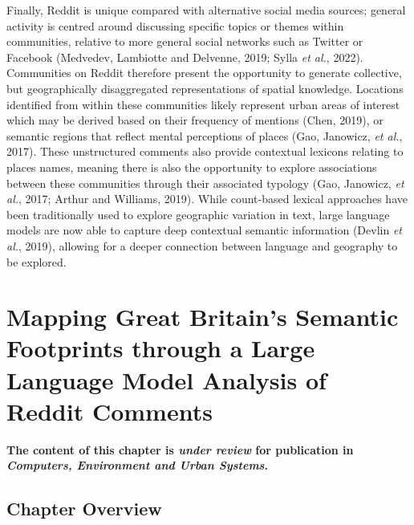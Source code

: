 \documentclass[
  letterpaper,
  11pt,
  english,
  onehalfspacing,
  headsepline]{MastersDoctoralThesis}
\begin{document}
Finally, Reddit is unique compared with alternative social media
sources; general activity is centred around discussing specific topics
or themes within communities, relative to more general social networks
such as Twitter or Facebook (Medvedev, Lambiotte and Delvenne, 2019;
Sylla \emph{et al.}, 2022). Communities on Reddit therefore present the
opportunity to generate collective, but geographically disaggregated
representations of spatial knowledge. Locations identified from within
these communities likely represent urban areas of interest which may be
derived based on their frequency of mentions (Chen, 2019), or semantic
regions that reflect mental perceptions of places (Gao, Janowicz,
\emph{et al.}, 2017). These unstructured comments also provide
contextual lexicons relating to places names, meaning there is also the
opportunity to explore associations between these communities through
their associated typology (Gao, Janowicz, \emph{et al.}, 2017; Arthur
and Williams, 2019). While count-based lexical approaches have been
traditionally used to explore geographic variation in text, large
language models are now able to capture deep contextual semantic
information (Devlin \emph{et al.}, 2019), allowing for a deeper
connection between language and geography to be explored.


\hypertarget{sec-footprint}{%
\chapter{Mapping Great Britain's Semantic Footprints through a Large
Language Model Analysis of Reddit Comments}\label{sec-footprint}}


\textbf{The content of this chapter is \emph{under review} for
publication in \emph{Computers, Environment and Urban Systems}.}

\hypertarget{chapter-overview-2}{%
\section*{Chapter Overview}\label{chapter-overview-2}}

\end{document}
